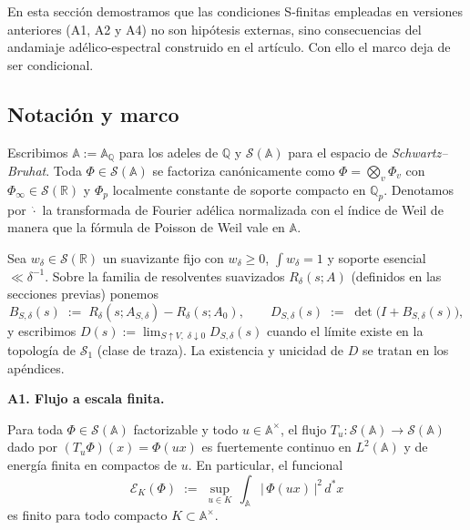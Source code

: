 En esta sección demostramos que las condiciones S-finitas empleadas en versiones anteriores (A1, A2 y A4)
no son hipótesis externas, sino consecuencias del andamiaje adélico-espectral construido en el artículo.
Con ello el marco deja de ser condicional.

\subsection*{Notación y marco}
Escribimos $\mathbb{A} := \mathbb{A}_\mathbb{Q}$ para los adeles de $\mathbb{Q}$ y $\mathcal{S}(\mathbb{A})$ para el espacio de \emph{Schwartz--Bruhat}.
Toda $\Phi\in \mathcal{S}(\mathbb{A})$ se factoriza canónicamente como $\Phi=\bigotimes_v \Phi_v$ con $\Phi_\infty\in \mathcal{S}(\mathbb{R})$
y $\Phi_p$ localmente constante de soporte compacto en $\mathbb{Q}_p$.
Denotamos por $\widehat{\cdot}$ la transformada de Fourier adélica normalizada con el
índice de Weil de manera que la fórmula de Poisson de Weil vale en $\mathbb{A}$.

\medskip

Sea $w_\delta\in \mathcal{S}(\mathbb{R})$ un suavizante fijo con $w_\delta\ge 0$, $\int w_\delta=1$ y soporte esencial $\ll \delta^{-1}$.
Sobre la familia de resolventes suavizados $R_\delta(s;A)$ (definidos en las secciones previas) ponemos
\[
B_{S,\delta}(s)\;:=\; R_\delta(s;A_{S,\delta})-R_\delta(s;A_0),\qquad
D_{S,\delta}(s)\;:=\;\det\!\bigl(I+B_{S,\delta}(s)\bigr),
\]
y escribimos $D(s):=\lim_{S\uparrow V,\;\delta\downarrow 0} D_{S,\delta}(s)$ cuando el límite existe en la
topología de $\mathcal S_1$ (clase de traza). La existencia y unicidad de $D$ se tratan en los apéndices.

\bigskip
\noindent\textbf{A1. Flujo a escala finita.}

\begin{lemma}\label{lem:A1}
Para toda $\Phi\in \mathcal{S}(\mathbb{A})$ factorizable y todo $u\in \mathbb{A}^\times$, el flujo
$T_u:\mathcal{S}(\mathbb{A})\to \mathcal{S}(\mathbb{A})$ dado por $(T_u\Phi)(x)=\Phi(ux)$ es fuertemente continuo en $L^2(\mathbb{A})$
y de energía finita en compactos de $u$. En particular, el funcional
\[
\mathcal E_K(\Phi)\;:=\;\sup_{u\in K}\,\int_{\mathbb{A}} \bigl|\,\Phi(ux)\,\bigr|^2\,d^\ast x
\]
es finito para todo compacto $K\subset \mathbb{A}^\times$.
\end{lemma}


